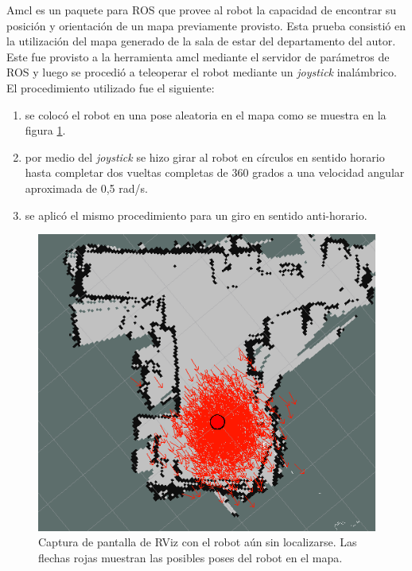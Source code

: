 Amcl es un paquete para ROS que provee al robot la capacidad de encontrar su posición y orientación de un mapa previamente provisto. Esta prueba consistió en la utilización del mapa generado de la sala de estar del departamento del autor. Este fue provisto a la herramienta amcl mediante el servidor de parámetros de ROS y luego se procedió a teleoperar el robot mediante un \textit{joystick} inalámbrico. El procedimiento utilizado fue el siguiente:

\begin{enumerate}
    \item se colocó el robot en una pose aleatoria en el mapa como se muestra en la figura \ref{fig:sinLocalizar}.
    \item por medio del \textit{joystick} se hizo girar al robot en círculos en sentido horario hasta completar dos vueltas completas de 360 grados a una velocidad angular aproximada de 0,5 rad/s.
    \item se aplicó el mismo procedimiento para un giro en sentido anti-horario.
\end{enumerate}


\begin{figure}[ht]
    \centering
    \includegraphics[scale=0.4]{./Figures/sin_localizar.png}
    \caption{Captura de pantalla de RViz con el robot aún sin localizarse. Las flechas rojas muestran las posibles poses del robot en el mapa.}
    \label{fig:sinLocalizar}
\end{figure}

